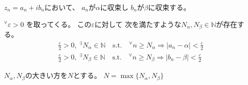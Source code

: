 \documentclass[12pt,b5paper]{ltjsarticle}
\begin{document}
\hrulefill

$z_n=a_n+ib_n$において、
$a_n$が$\alpha$に収束し
$b_n$が$\beta$に収束する。

${}^{\forall} \varepsilon > 0$
を取ってくる。
この$\varepsilon$に対して
次を満たすような$N_{\alpha},N_{\beta} \in \mathbb{N}$が存在する。
\begin{align}
 \frac{\varepsilon}{2} > 0,\; {}^{\exists}N_{\alpha} \in \mathbb{N}
 \quad \text{s.t.} \quad {}^{\forall}n \geq N_{\alpha} \Rightarrow \lvert a_{n}-\alpha \rvert < \frac{\varepsilon}{2}\\
 \frac{\varepsilon}{2} > 0,\; {}^{\exists}N_{\beta} \in \mathbb{N}
 \quad \text{s.t.} \quad {}^{\forall}n \geq N_{\beta} \Rightarrow \lvert b_{n}-\beta \rvert < \frac{\varepsilon}{2}
\end{align}

$N_{\alpha},N_{\beta}$の大きい方を$N$とする。
$N= \max\{N_{\alpha},N_{\beta}\}$




\hrulefill
\end{document}
